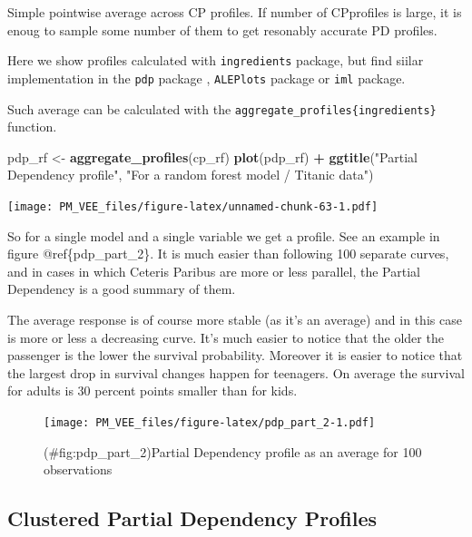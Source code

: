 \documentclass[12pt,]{krantz}
\newenvironment{Shaded}{\begin{snugshade}}{\end{snugshade}}
\newcommand{\KeywordTok}[1]{\textcolor[rgb]{0.13,0.29,0.53}{\textbf{#1}}}
\newcommand{\NormalTok}[1]{#1}
\newcommand{\OperatorTok}[1]{\textcolor[rgb]{0.81,0.36,0.00}{\textbf{#1}}}
\newcommand{\StringTok}[1]{\textcolor[rgb]{0.31,0.60,0.02}{#1}}
\theoremstyle{definition}
\theoremstyle{definition}
\theoremstyle{definition}
\theoremstyle{remark}
\begin{document}
Simple pointwise average across CP profiles. If number of CPprofiles is
large, it is enoug to sample some number of them to get resonably
accurate PD profiles.

Here we show profiles calculated with \texttt{ingredients} package, but
find siilar implementation in the \texttt{pdp} package \citep{pdp},
\texttt{ALEPlots} package \citep{R-ALEPlot} or \texttt{iml} \citep{iml}
package.

Such average can be calculated with the
\texttt{aggregate\_profiles\{ingredients\}} function.

\begin{Shaded}
\begin{Highlighting}[]
\NormalTok{pdp_rf <-}\StringTok{ }\KeywordTok{aggregate_profiles}\NormalTok{(cp_rf)}
\KeywordTok{plot}\NormalTok{(pdp_rf) }\OperatorTok{+}
\StringTok{  }\KeywordTok{ggtitle}\NormalTok{(}\StringTok{"Partial Dependency profile"}\NormalTok{, }\StringTok{"For a random forest model / Titanic data"}\NormalTok{) }
\end{Highlighting}
\end{Shaded}

\texttt{[image: PM\_VEE\_files/figure-latex/unnamed-chunk-63-1.pdf]}

So for a single model and a single variable we get a profile. See an
example in figure @ref\{pdp\_part\_2\}. It is much easier than following
100 separate curves, and in cases in which Ceteris Paribus are more or
less parallel, the Partial Dependency is a good summary of them.

The average response is of course more stable (as it's an average) and
in this case is more or less a decreasing curve. It's much easier to
notice that the older the passenger is the lower the survival
probability. Moreover it is easier to notice that the largest drop in
survival changes happen for teenagers. On average the survival for
adults is 30 percent points smaller than for kids.

\begin{figure}
\centering
\texttt{[image: PM\_VEE\_files/figure-latex/pdp\_part\_2-1.pdf]}
\caption{(\#fig:pdp\_part\_2)Partial Dependency profile as an average
for 100 observations}
\end{figure}

\hypertarget{clustered-partial-dependency-profiles}{%
\subsection{Clustered Partial Dependency
Profiles}\label{clustered-partial-dependency-profiles}}
\end{document}
